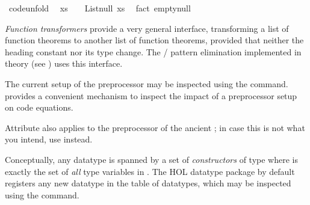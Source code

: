 \begin{isabellebody}
\begin{itemize}
\ {\isacharbrackleft}code{\isacharunderscore}unfold{\isacharbrackright}{\isacharcolon}\isanewline
\ \ {\isachardoublequoteopen}xs\ {\isacharequal}\ {\isacharbrackleft}{\isacharbrackright}\ {\isasymlongleftrightarrow}\ List{\isachardot}null\ xs{\isachardoublequoteclose}\ \isamarkupfalse%
\ {\isacharparenleft}fact\ empty{\isacharunderscore}null{\isacharparenright}%
\endisatagquote
{\isafoldquote}%
%
\isadelimquote
%
\endisadelimquote
%
\end{itemize}
%
\begin{isamarkuptext}%
\noindent \emph{Function transformers} provide a very general interface,
  transforming a list of function theorems to another
  list of function theorems, provided that neither the heading
  constant nor its type change.  The  / 
  pattern elimination implemented in
  theory  (see ) uses this
  interface.

  \noindent The current setup of the preprocessor may be inspected using
  the \hyperlink{command.print-codeproc}{\mbox{}} command.
  \hyperlink{command.code-thms}{\mbox{}} provides a convenient
  mechanism to inspect the impact of a preprocessor setup
  on code equations.

  \begin{warn}

    Attribute \hyperlink{attribute.code-unfold}{\mbox{}} also applies to the
    preprocessor of the ancient ; in case
    this is not what you intend, use \hyperlink{attribute.code-inline}{\mbox{}} instead.
  \end{warn}%
\end{isamarkuptext}%
\isamarkuptrue%
%
\isamarkuptrue%
%
\begin{isamarkuptext}%
Conceptually, any datatype is spanned by a set of
  \emph{constructors} of type  where  is exactly the set of \emph{all} type variables in
  \isa{{\isasymtau}}.  The HOL datatype package by default registers any new
  datatype in the table of datatypes, which may be inspected using the
  \hyperlink{command.print-codesetup}{\mbox{}} command.


\end{isamarkuptext}
\end{isabellebody}
